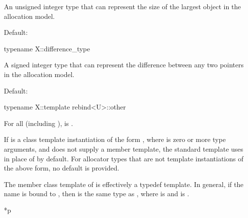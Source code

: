 \begin{itemdescr}
\pnum
\result
An unsigned integer type
that can represent the size of the largest object in the allocation model.

\pnum
\remarks
Default:
\end{itemdescr}

\begin{itemdecl}
typename X::difference_type
\end{itemdecl}

\begin{itemdescr}
\pnum
\result
A signed integer type that can represent
the difference between any two pointers in the allocation model.

\pnum
\remarks
Default:
\end{itemdescr}

\begin{itemdecl}
typename X::template rebind<U>::other
\end{itemdecl}

\begin{itemdescr}
\pnum
\result
{}

\pnum
\ensures
For all  (including ),
 is .

\pnum
\remarks
If  is a class template instantiation of the form
, where  is zero or more type
arguments, and  does not supply a  member
template, the standard  template uses
 in place of 
by default. For allocator types that are not template instantiations of the
above form, no default is provided.

\pnum
\begin{note}
The member class template  of  is
effectively a typedef template.
In general, if
the name  is bound to , then
 is the same type as
, where
 is  and
 is .
\end{note}
\end{itemdescr}

\begin{itemdecl}
*p
\end{itemdecl}

